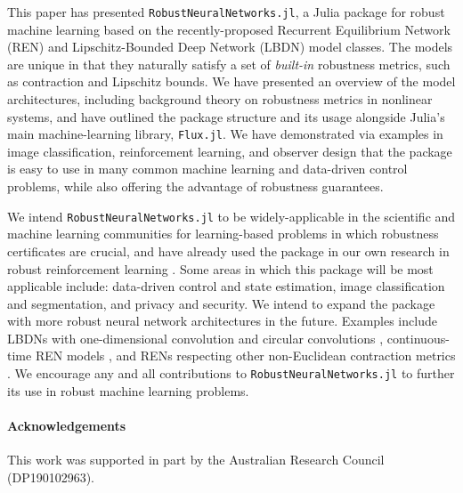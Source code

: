 This paper has presented \verb|RobustNeuralNetworks.jl|, a Julia package for robust machine learning based on the recently-proposed Recurrent Equilibrium Network (REN) and Lipschitz-Bounded Deep Network (LBDN) model classes. The models are unique in that they naturally satisfy a set of \textit{built-in} robustness metrics, such as contraction and Lipschitz bounds. We have presented an overview of the model architectures, including background theory on robustness metrics in nonlinear systems, and have outlined the package structure and its usage alongside Julia's main machine-learning library, \verb|Flux.jl|. We have demonstrated via examples in image classification, reinforcement learning, and observer design that the package is easy to use in many common machine learning and data-driven control problems, while also offering the advantage of robustness guarantees.

We intend \verb|RobustNeuralNetworks.jl| to be widely-applicable in the scientific and machine learning communities for learning-based problems in which robustness certificates are crucial, and have already used the package in our own research in robust reinforcement learning \cite{Barbara++2023}. Some areas in which this package will be most applicable include: data-driven control and state estimation, image classification and segmentation, and privacy and security. We intend to expand the package with more robust neural network architectures in the future. Examples include LBDNs with one-dimensional convolution \cite{Pauli++2022c} and circular convolutions \cite{Wang+Manchester2023}, continuous-time REN models \cite{Martinelli++2023}, and RENs respecting other non-Euclidean contraction metrics \cite{Davydov++2022}. We encourage any and all contributions to \verb|RobustNeuralNetworks.jl| to further its use in robust machine learning problems.

\paragraph*{Acknowledgements}
This work was supported in part by the Australian Research Council (DP190102963).